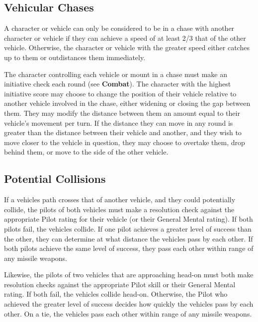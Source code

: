 \documentclass[oneside]{book}
\begin{document}
\begin{multicols}{2}

\subsection{Vehicular Chases}

A character or vehicle can only be considered to be in a chase with another character or vehicle if they can achieve a speed of at least 2/3 that of the other vehicle. Otherwise, the character or vehicle with the greater speed either catches up to them or outdistances them immediately.

The character controlling each vehicle or mount in a chase must make an initiative check each round (see \textbf{Combat}). The character with the highest initiative score may choose to change the position of their vehicle relative to another vehicle involved in the chase, either widening or closing the gap between them. They may modify the distance between them an amount equal to their vehicle's movement per turn. If the distance they can move in any round is greater than the distance between their vehicle and another, and they wish to move closer to the vehicle in question, they may choose to overtake them, drop behind them, or move to the side of the other vehicle.

\subsection{Potential Collisions}

If a vehicles path crosses that of another vehicle, and they could potentially collide, the pilots of both vehicles must make a resolution check against the appropriate Pilot rating for their vehicle (or their General Mental rating). If both pilots fail, the vehicles collide. If one pilot achieves a greater level of success than the other, they can determine at what distance the vehicles pass by each other. If both pilots achieve the same level of success, they pass each other within range of any missile weapons. 

Likewise, the pilots of two vehicles that are approaching head-on must both make resolution checks against the appropriate Pilot skill or their General Mental rating. If both fail, the vehicles collide head-on. Otherwise, the Pilot who achieved the greater level of success decides how quickly the vehicles pass by each other. On a tie, the vehicles pass each other within range of any missile weapons.


\end{multicols}
\end{document}
